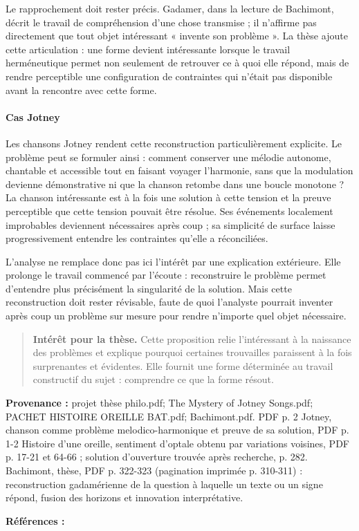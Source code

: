\documentclass[10pt,a4paper]{article}
\begin{document}
Le rapprochement doit rester précis. Gadamer, dans la lecture de Bachimont, décrit le travail de compréhension d'une chose transmise ; il n'affirme pas directement que tout objet intéressant « invente son problème ». La thèse ajoute cette articulation : une forme devient intéressante lorsque le travail herméneutique permet non seulement de retrouver ce à quoi elle répond, mais de rendre perceptible une configuration de contraintes qui n'était pas disponible avant la rencontre avec cette forme.

\paragraph{Cas Jotney}
Les chansons Jotney rendent cette reconstruction particulièrement explicite. Le problème peut se formuler ainsi : comment conserver une mélodie autonome, chantable et accessible tout en faisant voyager l'harmonie, sans que la modulation devienne démonstrative ni que la chanson retombe dans une boucle monotone ? La chanson intéressante est à la fois une solution à cette tension et la preuve perceptible que cette tension pouvait être résolue. Ses événements localement improbables deviennent nécessaires après coup ; sa simplicité de surface laisse progressivement entendre les contraintes qu'elle a réconciliées.

L'analyse ne remplace donc pas ici l'intérêt par une explication extérieure. Elle prolonge le travail commencé par l'écoute : reconstruire le problème permet d'entendre plus précisément la singularité de la solution. Mais cette reconstruction doit rester révisable, faute de quoi l'analyste pourrait inventer après coup un problème sur mesure pour rendre n'importe quel objet nécessaire.

\begin{quote}
\textbf{Intérêt pour la thèse.} Cette proposition relie l'intéressant à la naissance des problèmes et explique pourquoi certaines trouvailles paraissent à la fois surprenantes et évidentes. Elle fournit une forme déterminée au travail constructif du sujet : comprendre ce que la forme résout.
\end{quote}
{\footnotesize\color{metadata}\textbf{Provenance :} projet thèse philo.pdf; The Mystery of Jotney Songs.pdf; PACHET HISTOIRE OREILLE BAT.pdf; Bachimont.pdf. PDF p. 2 Jotney, chanson comme problème melodico-harmonique et preuve de sa solution, PDF p. 1-2 Histoire d'une oreille, sentiment d'optale obtenu par variations voisines, PDF p. 17-21 et 64-66 ; solution d'ouverture trouvée après recherche, p. 282. Bachimont, thèse, PDF p. 322-323 (pagination imprimée p. 310-311) : reconstruction gadamérienne de la question à laquelle un texte ou un signe répond, fusion des horizons et innovation interprétative.\par}
{\footnotesize\color{metadata}\textbf{Références :} \parencite{pachet2018oreille,bachimont1996hermeneutique}\par}
\end{document}
